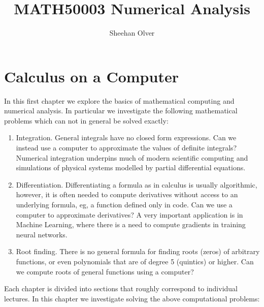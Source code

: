 \documentclass[12pt,a4paper]{book}
\title{ MATH50003 Numerical Analysis }
\author{ Sheehan Olver }
\theoremstyle{definition}
\begin{document}
\maketitle

\tableofcontents

\chapter{Calculus on a Computer}

In this first chapter we explore the basics of mathematical computing and numerical analysis.
In particular we investigate the following mathematical problems which can not in general be solved exactly:

\begin{enumerate}
\item Integration. General integrals have no closed form expressions. Can we instead use a computer to approximate the values of definite integrals? Numerical integration underpins much of modern scientific computing and simulations of physical systems modelled by partial differential equations. 
\item Differentiation. Differentiating a formula as in calculus is usually algorithmic, however, it is often needed to compute derivatives without access to an underlying formula, eg,  a function defined only in code. Can we use a computer to approximate derivatives?  A very important application is in Machine Learning, where there is a need to compute gradients in training neural networks.
\item Root finding. There is no general formula for finding roots (zeros) of arbitrary functions, or even polynomials that are of degree 5 (quintics) or higher. Can we compute roots of general functions using a computer?
\end{enumerate}

Each chapter is divided into sections that roughly correspond to individual lectures. In this chapter we investigate solving the above computational problems:
\end{document}
